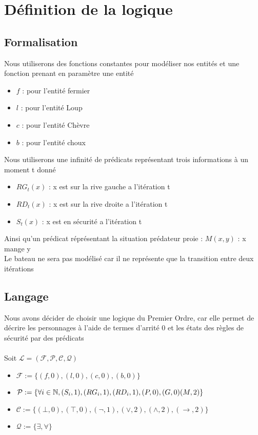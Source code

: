 \section{Définition de la logique}
\subsection{Formalisation}
Nous utiliserons des fonctions constantes pour modéliser nos entités et une fonction prenant en paramètre une entité
\begin{itemize}
  \item $f$ : pour l’entité fermier
  \item $l$ : pour l’entité Loup
  \item $c$ : pour l’entité Chèvre
  \item $b$ : pour l’entité choux
\end{itemize}
Nous utiliserons une infinité de prédicats représentant trois informations à un moment t donné
\begin{itemize}
  \item $RG_t(x)$ : x est sur la rive gauche a l’itération t
  \item $RD_t(x)$ : x est sur la rive droite a l’itération t
  \item $S_t(x)$ : x est en sécurité a l’itération t
\end{itemize}
Ainsi qu'un prédicat réprésentant la situation prédateur proie :
$M(x,y)$ : x mange y\\
Le bateau ne sera pas modélisé car il ne représente que la transition entre deux itérations
\subsection{Langage}
Nous avons décider de choisir une logique du Premier Ordre, car elle permet de décrire les personnages
à l’aide de termes d’arrité 0 et les états des règles de sécurité par des prédicats \\
\\
Soit $\mathcal{L} = (\mathcal{F} ,\mathcal{P} ,\mathcal{C} ,\mathcal{Q} )$
\begin{itemize}
  \item $ \mathcal{F} := \{(f,0),(l,0),(c,0),(b,0)\}$
  \item $ \mathcal{P} := \{\forall i \in \mathbb{N},(S_i,1),(RG_i,1),(RD_i,1),(P,0),(G,0)(M,2)\} $
  \item $ \mathcal{C} := \{(\bot , 0),(\top , 0),(\neg , 1), (\vee , 2), (\wedge , 2), (\rightarrow , 2)\}$
  \item $ \mathcal{Q} := \{\exists, \forall \}$
\end{itemize}
